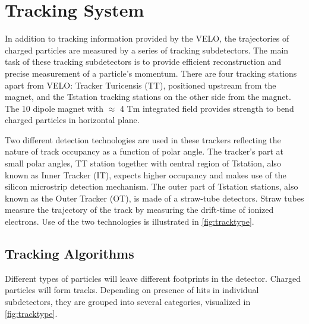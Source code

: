 \section{Tracking System }
\label{tracksys}
In addition to tracking information provided by the \Gls{VELO}, the trajectories of charged particles are measured by a series of tracking subdetectors. The main task of these tracking subdetectors is to provide efficient reconstruction and precise measurement of a particle's momentum. There are four tracking stations apart from \Gls{VELO}: Tracker Turicensis (\Gls{TT}), positioned upstream from the magnet, and the \Gls{Tstation} tracking stations on the other side from the magnet. The 10 \m dipole magnet with $\approx$ 4 Tm integrated field provides strength to bend charged particles in horizontal plane.

 Two different detection technologies are used in these trackers reflecting the nature of track occupancy as a function of polar angle. The tracker's part at small polar angles, \Gls{TT} station together with central region of \Gls{Tstation}, also known as Inner Tracker (\Gls{IT}), expects higher occupancy and makes use of the silicon microstrip detection mechanism. The outer part of \Gls{Tstation} stations, also known as the Outer Tracker (\Gls{OT}), is made of a straw-tube detectors. Straw tubes measure the trajectory of the track by measuring the drift-time of ionized electrons. Use of the two technologies is illustrated in \autoref{fig:tracktype}. 

\subsection{Tracking Algorithms} 
Different types of particles will leave different footprints in the detector. Charged particles will form tracks. Depending on presence of hits in individual subdetectors, they are grouped into several categories, visualized in \autoref{fig:tracktype}.

